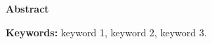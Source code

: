 \newpage
\thispagestyle{fancy}

\begin{center}
  {\large\bfseries Abstract}
\end{center}
\vspace{0.4em}


\vspace{0.8em}
\noindent\textbf{Keywords:} keyword 1, keyword 2, keyword 3.
